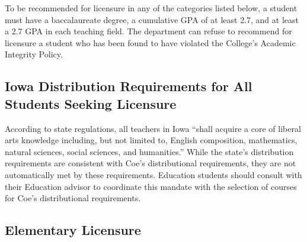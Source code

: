 \documentclass[
  letterpaper,
]{scrbook}
\begin{document}
To be recommended for licensure in any of the categories listed below, a
student must have a baccalaureate degree, a cumulative GPA of at least
2.7, and at least a 2.7 GPA in each teaching field. The department can
refuse to recommend for licensure a student who has been found to have
violated the College's Academic Integrity Policy.

\subsection{Iowa Distribution Requirements for All Students Seeking
Licensure}\label{iowa-distribution-requirements-for-all-students-seeking-licensure}

According to state regulations, all teachers in Iowa ``shall acquire a
core of liberal arts knowledge including, but not limited to, English
composition, mathematics, natural sciences, social sciences, and
humanities.'' While the state's distribution requirements are consistent
with Coe's distributional requirements, they are not automatically met
by these requirements. Education students should consult with their
Education advisor to coordinate this mandate with the selection of
courses for Coe's distributional requirements.

\subsection{Elementary Licensure}\label{elementary-licensure}
\end{document}
